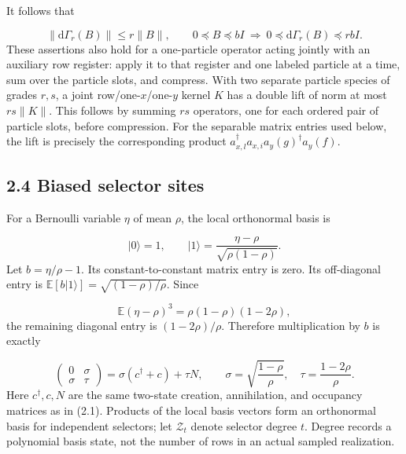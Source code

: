 \documentclass[11pt,a4paper]{article}
\begin{document}
It follows that

\begin{equation}
\|\mathrm d\Gamma_r(B)\|\le r\|B\|,\qquad
0\preceq B\preceq bI\ \Longrightarrow\
0\preceq\mathrm d\Gamma_r(B)\preceq rbI .
\tag{2.8}
\end{equation}
These assertions also hold for a one-particle operator acting jointly with an auxiliary row register: apply it to that register and one labeled particle at a time, sum over the particle slots, and compress. With two separate particle species of grades \(r,s\), a joint row/one-\(x\)/one-\(y\) kernel \(K\) has a double lift of norm at most \(rs\|K\|\). This follows by summing \(rs\) operators, one for each ordered pair of particle slots, before compression. For the separable matrix entries used below, the lift is precisely the corresponding product \(a_{x,l}^\dagger a_{x,i}a_y(g)^\dagger a_y(f)\).

\subsection*{2.4 Biased selector sites}
For a Bernoulli variable \(\eta\) of mean \(\rho\), the local orthonormal basis is

\begin{equation}
|0\rangle=1,\qquad
|1\rangle=\frac{\eta-\rho}{\sqrt{\rho(1-\rho)}}.
\tag{2.9}
\end{equation}
Let \(b=\eta/\rho-1\). Its constant-to-constant matrix entry is zero. Its off-diagonal entry is \(\mathbb E[b|1\rangle]=\sqrt{(1-\rho)/\rho}\). Since

\begin{equation}
\mathbb E(\eta-\rho)^3=\rho(1-\rho)(1-2\rho),
\tag{2.10}
\end{equation}
the remaining diagonal entry is \((1-2\rho)/\rho\). Therefore multiplication by \(b\) is exactly

\begin{equation}
\begin{pmatrix}0&\sigma\\ \sigma&\tau\end{pmatrix}
=\sigma(c^\dagger+c)+\tau N,
\qquad
\sigma=\sqrt{\frac{1-\rho}{\rho}},\quad
\tau=\frac{1-2\rho}{\rho}.
\tag{2.11}
\end{equation}
Here \(c^\dagger,c,N\) are the same two-state creation, annihilation, and occupancy matrices as in (2.1). Products of the local basis vectors form an orthonormal basis for independent selectors; let \(\mathcal Z_t\) denote selector degree \(t\). Degree records a polynomial basis state, not the number of rows in an actual sampled realization.
\end{document}
